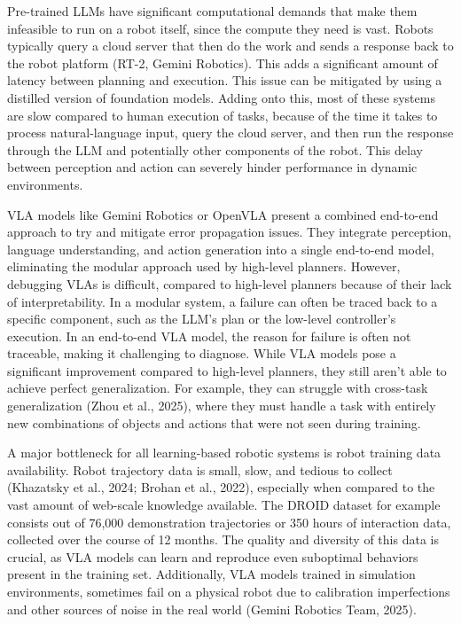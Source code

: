 \documentclass[11pt]{article}
\begin{document}
Pre-trained LLMs have significant computational demands that make them infeasible to run on a robot itself, since the compute they need is vast. Robots typically query a cloud server that then do the work and sends a response back to the robot platform (RT-2, Gemini Robotics). This adds a significant amount of latency between planning and execution. This issue can be mitigated by using a distilled version of foundation models. 
Adding onto this, most of these systems are slow compared to human execution of tasks, because of the time it takes to process natural-language input, query the cloud server, and then run the response through the LLM and potentially other components of the robot. This delay between perception and action can severely hinder performance in dynamic environments.

VLA models like Gemini Robotics or OpenVLA present a combined end-to-end approach to try and mitigate error propagation issues. They integrate perception, language understanding, and action generation into a single end-to-end model, eliminating the modular approach used by high-level planners.
However, debugging VLAs is difficult, compared to high-level planners because of their lack of interpretability. In a modular system, a failure can often be traced back to a specific component, such as the LLM's plan or the low-level controller's execution. In an end-to-end VLA model, the reason for failure is often not traceable, making it challenging to diagnose. While VLA models pose a significant improvement compared to high-level planners, they still aren't able to achieve perfect generalization. For example, they can struggle with cross-task generalization (Zhou et al., 2025), where they must handle a task with entirely new combinations of objects and actions that were not seen during training.

A major bottleneck for all learning-based robotic systems is robot training data availability. Robot trajectory data is small, slow, and tedious to collect (Khazatsky et al., 2024; Brohan et al., 2022), especially when compared to the vast amount of web-scale knowledge available. The DROID dataset for example consists out of 76,000 demonstration trajectories or 350 hours of interaction data, collected over the course of 12 months. The quality and diversity of this data is crucial, as VLA models can learn and reproduce even suboptimal behaviors present in the training set. Additionally, VLA models trained in simulation environments, sometimes fail on a physical robot due to calibration imperfections and other sources of noise in the real world (Gemini Robotics Team, 2025).
\end{document}
